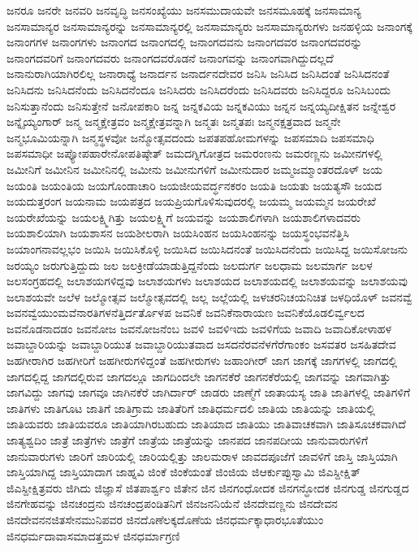{ಜನರೂ
ಜನರೇ
ಜನವರಿ
ಜನವೃದ್ಧಿ
ಜನಸಂಖ್ಯೆಯು
ಜನಸಮುದಾಯವೇ
ಜನಸಮೂಹಕ್ಕೆ
ಜನಸಾಮಾನ್ಯ
ಜನಸಾಮಾನ್ಯರ
ಜನಸಾಮಾನ್ಯರನ್ನು
ಜನಸಾಮಾನ್ಯರಲ್ಲಿ
ಜನಸಾಮಾನ್ಯರು
ಜನಸಾಮಾನ್ಯರುಗಳು
ಜನಹಳ್ಳಿಯ
ಜನಾಂಗಕ್ಕೆ
ಜನಾಂಗಗಳ
ಜನಾಂಗಗಳು
ಜನಾಂಗದ
ಜನಾಂಗದಲ್ಲಿ
ಜನಾಂಗದವನು
ಜನಾಂಗದವರ
ಜನಾಂಗದವರನ್ನು
ಜನಾಂಗದವರಿಗೆ
ಜನಾಂಗದವರು
ಜನಾಂಗದವರೊಡನೆ
ಜನಾಂಗವನ್ನು
ಜನಾಂಗವಾಗಿದ್ದುದಲ್ಲದೆ
ಜನಾನುರಾಗಿಯಾಗಿರಲಿಲ್ಲ
ಜನಾರಾಧ್ಯೆ
ಜನಾರ್ದನ
ಜನಾರ್ದನದೇವರ
ಜನಿಸಿ
ಜನಿಸಿದ
ಜನಿಸಿದಂತೆ
ಜನಿಸಿದನಂತೆ
ಜನಿಸಿದನು
ಜನಿಸಿದನೆಂದು
ಜನಿಸಿದನೆಂದೂ
ಜನಿಸಿದರು
ಜನಿಸಿದರೆಂದು
ಜನಿಸಿದವರು
ಜನಿಸಿದ್ದರೂ
ಜನಿಸಿಬಂದು
ಜನಿಸುತ್ತಾನೆಂದು
ಜನಿಸುತ್ತೇನೆ
ಜನೋಪಕಾರಿ
ಜನ್ನ
ಜನ್ನಕವಿಯ
ಜನ್ನಕವಿಯು
ಜನ್ನನ
ಜನ್ನಯ್ಯದೀಕ್ಷಿತನ
ಜನ್ನೇಶ್ವರ
ಜನ್ನೈಯ್ಯಂಗಾರ್
ಜನ್ಮ
ಜನ್ಮಕ್ಷೇತ್ರವಂ
ಜನ್ಮಕ್ಷೇತ್ರವನ್ನಾಗಿ
ಜನ್ಮತಃ
ಜನ್ಮತಪಃ
ಜನ್ಮನಕ್ಷತ್ರವಾದ
ಜನ್ಮನೇ
ಜನ್ಮಭೂಮಿಯನ್ನಾಗಿ
ಜನ್ಮಸ್ಥಳವೋ
ಜನ್ಮೋತ್ಸವದಂದು
ಜಪತಪಹೋಮಗಳನ್ನು
ಜಪಸಮಾದಿ
ಜಪಸಮಾಧಿ
ಜಪಸಮಾಧೀ
ಜಪ್ಯೋಪಹಾರೇನೋಪತಿಷ್ಠೇತ್
ಜಮದಗ್ನಿಗೋತ್ರದ
ಜಮರಂಣನು
ಜಮರಣ್ಣನು
ಜಮೀನಗಳಲ್ಲಿ
ಜಮೀನಿಗೆ
ಜಮೀನಿನ
ಜಮೀನಿನಲ್ಲಿ
ಜಮೀನು
ಜಮೀನುಗಳಿಗೆ
ಜಮೀನುದಾರ
ಜಮ್ಮಜಮ್ಮಾಂತರದೊಳ್
ಜಯ
ಜಯಂತಿ
ಜಯಂತಿಯ
ಜಯಗೊಂಡಾಚಾರಿ
ಜಯಜೀಯವರ್ದ್ಧನಕರಂ
ಜಯತಿ
ಜಯತು
ಜಯತ್ಯಸೌ
ಜಯದ
ಜಯದುತ್ತರಂಗ
ಜಯನಾಮ
ಜಯಪತ್ರದ
ಜಯಪ್ರಿಯಗೊಳಿಸುವುದರಲ್ಲಿ
ಜಯಮ್ಮ
ಜಯಮ್ಮನ
ಜಯರೇಖೆ
ಜಯರೇಖೆಯನ್ನು
ಜಯಲಕ್ಷ್ಮಿಗಿತ್ತು
ಜಯಲಕ್ಷ್ಮಿಗೆ
ಜಯವನ್ನು
ಜಯಶಾಲಿಗಳಾಗಿ
ಜಯಶಾಲಿಗಳಾದವರು
ಜಯಶಾಲಿಯಾಗಿ
ಜಯಶಾಸನ
ಜಯಶೀಲರಾಗಿ
ಜಯಸಿಂಹನ
ಜಯಸಿಂಹನನ್ನು
ಜಯಸ್ಥಂಭವನೆತ್ತಿಸಿ
ಜಯಾಂಗನಾವಲ್ಲಭಂ
ಜಯಿಸಿ
ಜಯಿಸಿಕೊಳ್ಳಿ
ಜಯಿಸಿದ
ಜಯಿಸಿದನಂತೆ
ಜಯಿಸಿದನೆಂದು
ಜಯಿಸಿದ್ದ
ಜಯಿಸೋಜನು
ಜರಯ್ಯಂ
ಜರುಗುತ್ತಿದ್ದುದು
ಜಲ
ಜಲಕ್ರೀಡೆಯಾಡುತ್ತಿದ್ದನೆಂದು
ಜಲದುರ್ಗ
ಜಲಧಾಮ
ಜಲಮಾರ್ಗ
ಜಲಳ
ಜಲಸಂಗ್ರಹದಲ್ಲಿ
ಜಲಾಶಯಗಳಿದ್ದವು
ಜಲಾಶಯಗಳು
ಜಲಾಶಯದ
ಜಲಾಶಯದಲ್ಲಿ
ಜಲಾಶಯವನ್ನು
ಜಲಾಶಯವು
ಜಲಾಶಯವೇ
ಜಲೆಳ
ಜಲ್ಮೋತ್ಸವ
ಜಲ್ಮೋತ್ಸವದಲ್ಲಿ
ಜಲ್ಲ
ಜಲ್ಲೆಯಲ್ಲಿ
ಜಳಚರನಿಚಯನಿಚಿತ
ಜಳಧಿಯೊಳ್
ಜವನವ್ವೆ
ಜವನವ್ವೆಯುಂಮವೆನಾರತಿಗಳನೆತ್ತಿರ್ದರ್ತೊಳಪ
ಜವನಿಕೆ
ಜವನಿಕೆನಾರಾಯಣ
ಜವನಿಕೆಯೊಡಲಿರ್ವ್ವಲದ
ಜವನೊಡನಾದಡಂ
ಜವನೋಜ
ಜವನೋಜನೆಂಬ
ಜವಳಿ
ಜವಳಿಇದು
ಜವಳಿಗೆಯ
ಜವಾದಿ
ಜವಾದಿಕೋಳಾಹಳ
ಜವಾಬ್ದಾರಿಯನ್ನು
ಜವಾಬ್ದಾರಿಯುತ
ಜವಾಬ್ದಾರಿಯುತವಾದ
ಜಸದನೆರವನೆಳಗೆರೆಗಾಂಕಂ
ಜಸವತರ
ಜಸಹಿತದೇವ
ಜಹಗೀರಾಗಿರ
ಜಹಗೀರಿಗೆ
ಜಹಗೀರುಗಳಿದ್ದಂತೆ
ಜಹಗೀರುಗಳು
ಜಹಾಂಗೀರ್
ಜಾಗ
ಜಾಗಕ್ಕೆ
ಜಾಗಗಳಲ್ಲಿ
ಜಾಗದಲ್ಲಿ
ಜಾಗದಲ್ಲಿದ್ದ
ಜಾಗದಲ್ಲಿರುವ
ಜಾಗದಲ್ಲೂ
ಜಾಗದಿಂದಲೇ
ಜಾಗನಕೆರೆ
ಜಾಗನಕೆರೆಯಲ್ಲಿ
ಜಾಗವನ್ನು
ಜಾಗವಾಗಿತ್ತು
ಜಾಗವಿದ್ದು
ಜಾಗವು
ಜಾಗವೂ
ಜಾಗಿನಕೆರೆ
ಜಾಗಿರ್ದಾರ್
ಜಾಡರು
ಜಾಣ್ಮೆಗೆ
ಜಾತಾಯಸ್ಯ
ಜಾತಿ
ಜಾತಿಗಳಲ್ಲಿ
ಜಾತಿಗಳಿಗೆ
ಜಾತಿಗಳು
ಜಾತಿಗೂಟ
ಜಾತಿಗೆ
ಜಾತಿಗ್ರಾಮ
ಜಾತಿತೆರಿಗೆ
ಜಾತಿಧರ್ಮದಲಿ
ಜಾತಿಯ
ಜಾತಿಯನ್ನು
ಜಾತಿಯಲ್ಲಿ
ಜಾತಿಯವರು
ಜಾತಿಯವರೂ
ಜಾತಿಯಾಗಿರಬಹುದು
ಜಾತಿಯಾದ
ಜಾತಿಯು
ಜಾತಿವಾಚಕವಾಗಿ
ಜಾತಿಸೂಚಕವಾಗಿದೆ
ಜಾತ್ಯಶ್ವದಿಂ
ಜಾತ್ರೆ
ಜಾತ್ರೆಗಳು
ಜಾತ್ರೆಗೆ
ಜಾತ್ರೆಯ
ಜಾತ್ರೆಯನ್ನು
ಜಾನಪದ
ಜಾನಪದೀಯ
ಜಾನುವಾರುಗಳಿಗೆ
ಜಾನುವಾರುಗಳು
ಜಾರಿಗೆ
ಜಾರಿಯಲ್ಲಿ
ಜಾರಿಯಲ್ಲಿತ್ತು
ಜಾಲಮರಾಳ
ಜಾವದಪೂಜೆಗೆ
ಜಾವಳಿಗೆ
ಜಾಸ್ತಿ
ಜಾಸ್ತಿಯಾಗಿ
ಜಾಸ್ತಿಯಾಗಿದ್ದ
ಜಾಸ್ತಿಯಾದಾಗ
ಜಾಹ್ನವಿ
ಜಿಂಕೆ
ಜಿಂಕೆಯಂತೆ
ಜಿಂಜಿಯ
ಜಿಆರ್ಕುಪ್ಪುಸ್ವಾಮಿ
ಜಿಎಸ್ದೀಕ್ಷಿತ್
ಜಿಎಸ್ದೀಕ್ಷಿತ್ರವರು
ಜಿಗಿದು
ಜಿಜ್ಞಾಸೆ
ಜಿತಪಾರ್ಶ್ವಂ
ಜಿತೇನ
ಜಿನ
ಜಿನಗಂಧೋದಕ
ಜಿನಗನ್ಧೋದಕ
ಜಿನಗುಡ್ಡ
ಜಿನಗುಡ್ಡದ
ಜಿನಗೇಹವನ್ನು
ಜಿನಚಂದ್ರನು
ಜಿನಚಂದ್ರಪಂಡಿತನಿಗೆ
ಜಿನಜನನಿಯೆನೆ
ಜಿನದೇವಣ್ಣನು
ಜಿನದೇವನ
ಜಿನದೇವನನಜಿತಸೇನಮುನಿಪವರ
ಜಿನದೊಣೆಲಕ್ಕದೊಣೆಯ
ಜಿನಧರ್ಮಕ್ಕಾಧಾರಭೂತೆಯುಂ
ಜಿನಧರ್ಮದಾವಾಸಮಾದತ್ತಮಳ
ಜಿನಧರ್ಮಾಗ್ರಣಿ
}
